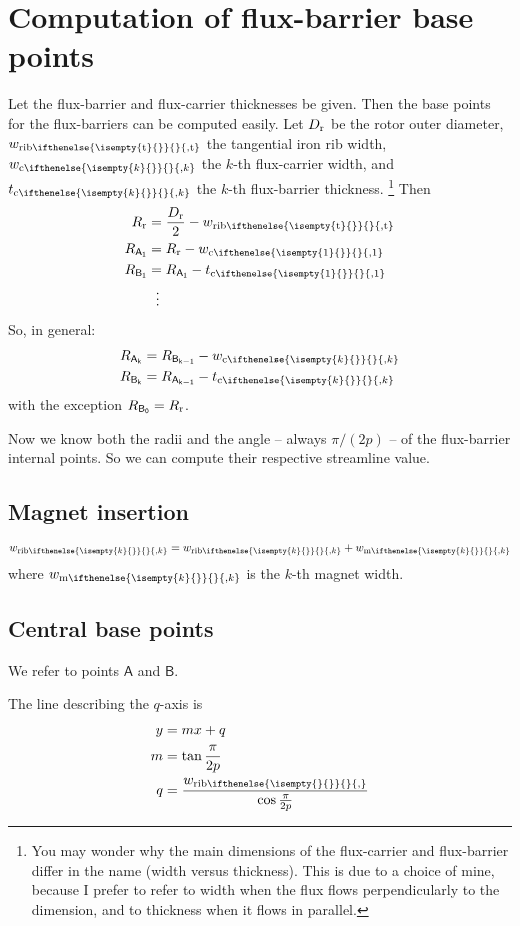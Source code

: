 \documentclass[b5paper,11pt,oneside,fleqn]{article}
\newcommand{\ped}[1]{_\textup{#1}}
\newcommand{\pt}[1]{\mathsf{#1}}
\newcommand{\wm}[1][]{%
w_{\textup{m}
\ifthenelse{\isempty{#1}{}}{}{,#1}%
}}
\newcommand{\wc}[1][]{%
w_{\textup{c}
\ifthenelse{\isempty{#1}{}}{}{,#1}%
}}
\newcommand{\tb}[1][]{%
t_{\textup{c}
\ifthenelse{\isempty{#1}{}}{}{,#1}%
}}
\newcommand{\wrib}[1][]{%
w_{\textup{rib}
\ifthenelse{\isempty{#1}{}}{}{,#1}%
}}
\newcommand{\wribt}{\wrib[\text{t}]}
\newcommand{\xth}[1]{$ #1 $-th}
\begin{document}
\section{Computation of flux-barrier base points}
Let the flux-barrier and flux-carrier thicknesses be given.
Then the base points for the flux-barriers can be computed easily.
Let
$ D\ped{r} $ be the rotor outer diameter,
$ \wribt $ the tangential iron rib width,
$ \wc[k] $ the \xth{k} flux-carrier width, 
and $ \tb[k] $ the \xth{k} flux-barrier thickness.%
\footnote{%
You may wonder why the main dimensions of the flux-carrier and 
flux-barrier differ in the name (width versus thickness).
This is due to a choice of mine,
because I prefer to refer to width when the flux flows perpendicularly to the 
dimension, 
and to thickness when it flows in parallel.%
}
%
Then
\begin{equation}
\begin{aligned}
R\ped{r} &= \frac{D\ped{r}}{2} - \wribt \\
R_\pt{A_1} &= R\ped{r} - \wc[1] \\
R_\pt{B_1} &= R_\pt{A_1} - \tb[1] \\
    &\:\:\,\vdots 
\end{aligned}
\end{equation}
%
So, in general:
\begin{equation}
\begin{aligned}
R_\pt{A_k} &= R_\pt{B_{k-1}} - \wc[k] \\
R_\pt{B_k} &= R_\pt{A_{k-1}} - \tb[k] 
\end{aligned}
\end{equation}
with the exception $ R_\pt{B_0} = R\ped{r} $.

Now we know both the radii and the angle -- always $ \pi/(2p) $ -- of the 
flux-barrier internal points. So we can compute their respective streamline 
value.



\subsection{Magnet insertion}
\[
\wrib[k] = \wrib[k] + \wm[k]
\]
where $ \wm[k] $ is the \xth{k} magnet width.


\subsection{Central base points}
We refer to points $ \pt{A} $ and $ \pt{B} $.

The line describing the $ q $-axis is
\begin{equation}
\begin{aligned}
y &= m x + q \\
m &= \tan\frac{\pi}{2p} \\
q &= \frac{\wrib}{\cos\frac{\pi}{2p}}
\end{aligned}
\end{equation}
\end{document}
